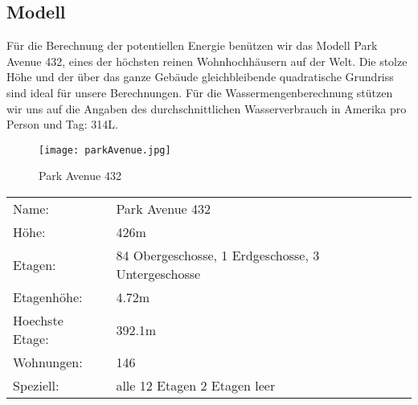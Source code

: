 \subsection{Modell} \label{subsec:modell}

Für die Berechnung der potentiellen Energie benützen wir das Modell Park Avenue 432, eines der höchsten reinen Wohnhochhäusern auf der Welt. Die stolze Höhe und der über das ganze Gebäude gleichbleibende quadratische Grundriss sind ideal für unsere Berechnungen. Für die Wassermengenberechnung stützen wir uns auf die Angaben des durchschnittlichen Wasserverbrauch in Amerika pro Person und Tag: 314\si{L}. \cite{waterUsAmerica}

\begin{figure} [H]
	\centering
	\texttt{[image: parkAvenue.jpg]}
	\caption{Park Avenue 432 \cite{432_Park_Avenue}}
	\label{fig:Park_Avenue_432}
\end{figure}

\begin{table}[H]
\centering
\begin{tabular}{ll}
Name:				&Park Avenue 432\\
Höhe: 				&426m\\          
Etagen:				&84 Obergeschosse, 1 Erdgeschosse, 3 Untergeschosse\\
Etagenhöhe:			&4.72m\\
Hoechste Etage:		&392.1m\\
Wohnungen:			&146\\
Speziell:			&alle 12 Etagen 2 Etagen leer\\           
\end{tabular}
\end{table}

\newpage
